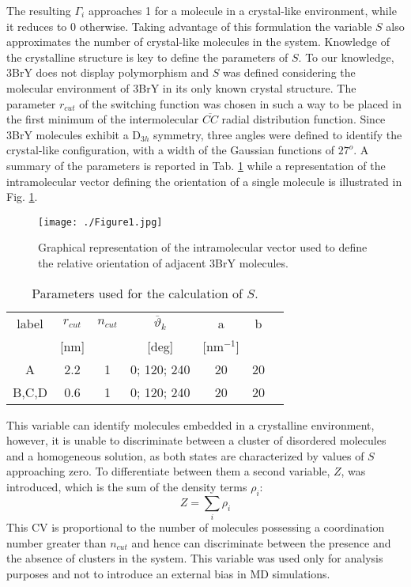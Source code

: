 \documentclass[journal=cgdefu,manuscript=article,layout=twocolumn]{achemso}
\begin{document}
The resulting $\Gamma_i$ approaches 1 for a molecule in a crystal-like environment, while it reduces to 0 otherwise. Taking advantage of this formulation the variable $S$ also approximates the number of crystal-like molecules in the system. 
Knowledge of the crystalline structure is key to define the parameters of $S$. To our knowledge, 3BrY does not display polymorphism and $S$ was defined considering the molecular environment of 3BrY in its only known crystal structure\cite{salvalaglio20141}. 
The parameter $r_{cut}$ of the switching function was chosen in such a way to be placed in the first minimum of the intermolecular $\overline{CC}$ radial distribution function. Since 3BrY molecules exhibit a D$_{3h}$ symmetry, three angles were defined to identify the crystal-like configuration, with a width of the Gaussian functions of $27^{o}$. 
A summary of the parameters is reported in Tab. \ref{tab:3bryvariable} while a representation of the intramolecular vector defining the orientation of a single molecule is illustrated in Fig. \ref{fig:3brymolecule}. 


\begin{figure}[ht!]
\centering
\texttt{[image: ./Figure1.jpg]}
\caption{Graphical representation of the intramolecular vector used to define the relative orientation of adjacent 3BrY molecules.}
\label{fig:3brymolecule}  
\end{figure}

\begin{table}[ht!]
\centering
 \caption{Parameters used for the calculation of $S$.}
\begin{tabular}{ccccccc}
\label{tab:3bryvariable}
label   & $r_{cut}$& $n_{cut}$  & $\overline{\vartheta}_k$  & a& b \\
&  \small [nm] &  &  \small [deg] & \small [nm$^{-1}$] &  & \\ \hline
A   & 2.2  &   1    &  0; 120; 240        & 20 & 20  \\ 
B,C,D   & 0.6  &   1    &  0; 120; 240        & 20 & 20  
\end{tabular}
\end{table}

This variable can identify molecules embedded in a crystalline environment, however, it is unable to discriminate between a cluster of disordered molecules and a homogeneous solution, as both states are characterized by values of $S$ approaching zero. To differentiate between them a second variable, $Z$, was introduced, which is the sum of the density terms $\rho_i$: 
\begin{equation}
 Z= \sum_i \rho_i 
\label{eqn:SMCC}
\end{equation}
This CV is proportional to the number of molecules possessing a coordination number greater than $n_{cut}$ and hence can discriminate between the presence and the absence of clusters in the system. This variable was used only for analysis purposes and not to introduce an external bias in MD simulations.
\end{document}
